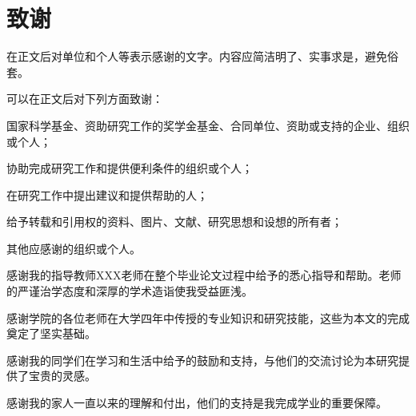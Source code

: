 
\chapter{致谢}

在正文后对单位和个人等表示感谢的文字。内容应简洁明了、实事求是，避免俗套。

可以在正文后对下列方面致谢：

国家科学基金、资助研究工作的奖学金基金、合同单位、资助或支持的企业、组织或个人；

协助完成研究工作和提供便利条件的组织或个人；

在研究工作中提出建议和提供帮助的人；

给予转载和引用权的资料、图片、文献、研究思想和设想的所有者；

其他应感谢的组织或个人。

感谢我的指导教师XXX老师在整个毕业论文过程中给予的悉心指导和帮助。老师的严谨治学态度和深厚的学术造诣使我受益匪浅。

感谢学院的各位老师在大学四年中传授的专业知识和研究技能，这些为本文的完成奠定了坚实基础。

感谢我的同学们在学习和生活中给予的鼓励和支持，与他们的交流讨论为本研究提供了宝贵的灵感。

感谢我的家人一直以来的理解和付出，他们的支持是我完成学业的重要保障。
